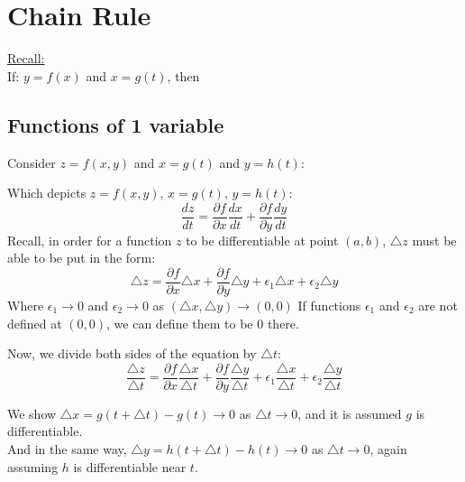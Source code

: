 \documentclass[12pt]{article}
\begin{document}
\section{Chain Rule}
\underline{Recall:} \\
If: \(y=f(x)\) and \(x=g(t)\), then 

\fbox{
	\begin{minipage}{1in}
	\[
		\frac{dy}{dt}=\frac{dy}{dx} * \frac{dx}{dt}
	\]
	\end{minipage}
}

\subsection{Functions of 1 variable}
Consider \(z=f(x,y)\) and \(x=g(t)\) and \(y=h(t)\):\\

Which depicts \(z=f(x,y)\), \(x=g(t)\), \(y=h(t)\):
\[
	\frac{dz}{dt} = \frac{\partial f}{\partial x} \frac{dx}{dt} + \frac{\partial f}{\partial y} \frac{dy}{dt}
\]
Recall, in order for a function \(z\) to be differentiable at point \((a,b)\), \(\triangle z\) must be able to be put in the form:
\[
	\triangle z = \frac{\partial f}{\partial x} \triangle x + \frac{\partial f}{\partial y} \triangle y + \epsilon_1\triangle x + \epsilon_2\triangle y
\]
Where \(\epsilon_1 \rightarrow 0\) and \(\epsilon_2 \rightarrow 0\) as \((\triangle x, \triangle y) \rightarrow (0,0)\)
If functions \(\epsilon_1\) and \(\epsilon_2\) are not defined at \((0,0)\), we can define them to be 0 there.

Now, we divide both sides of the equation by \(\triangle t\):
\[
	\frac{\triangle z}{\triangle t} = \frac{\partial f}{\partial x} \frac{\triangle x}{\triangle t} + \frac{\partial f}{\partial y} \frac{\triangle y }{\triangle t} + \epsilon_1 \frac{\triangle x}{\triangle t} + \epsilon_2 \frac{\triangle y }{\triangle t}
\]

We show \(\triangle x = g(t+\triangle t) - g(t) \rightarrow 0\) as \(\triangle t \rightarrow 0\), and it is assumed \(g\) is differentiable. 
\\And in the same way, \(\triangle y = h(t+\triangle t) - h(t) \to 0\) as \(\triangle t \to 0\), again assuming \(h\) is differentiable near \(t\).
\end{document}
